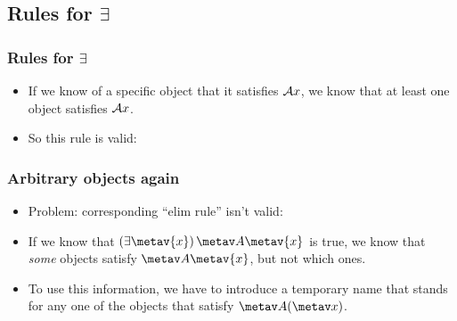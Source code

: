 \subsection{Rules for $\exists$}

\begin{frame}
\frametitle{Rules for $\exists$}

\begin{itemize}[<+->]
\item If we know of a specific object that it satisfies $\mathcal{A}x$, we know that at least one object satisfies $\mathcal{A}x$.
\item So this rule is valid:
\begin{fitchproof}
\end{fitchproof}
\end{itemize}
\end{frame}

\begin{frame}
\frametitle{Arbitrary objects again}

\begin{itemize}
  \item Problem: corresponding ``elim rule'' isn't valid:
  \begin{fitchproof}
  \end{fitchproof}
  \item If we know that $\qt{\exists}{\metav{x}}\, \metav A\qv{\metav{x}}$ is
  true, we know that \emph{some} objects satisfy $\metav A\qv{\metav{x}}$,
  but not which ones.
\item To use this information, we have to introduce a temporary name
that stands for any one of the objects that satisfy $\metav A(\metav
x)$.
\end{itemize}
\end{frame}

